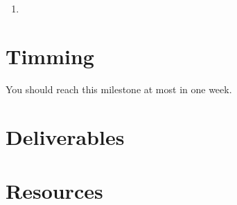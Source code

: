 \begin{enumerate}

\item
  
\end{enumerate}

\section{Timming}

You should reach this milestone at most in one week.

\section{Deliverables}

\section{Resources}


